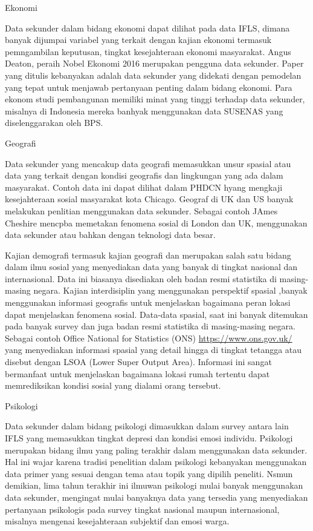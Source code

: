 \documentclass[
]{book}
\begin{document}
Ekonomi

Data sekunder dalam bidang ekonomi dapat dilihat pada data IFLS, dimana banyak dijumpai variabel yang terkait dengan kajian ekonomi termasuk pemngambilan keputusan, tingkat kesejahteraan ekonomi masyarakat. Angus Deaton, peraih Nobel Ekonomi 2016 merupakan pengguna data sekunder. Paper yang ditulis kebanyakan adalah data sekunder yang didekati dengan pemodelan yang tepat untuk menjawab pertanyaan penting dalam bidang ekonomi. Para ekonom studi pembangunan memiliki minat yang tinggi terhadap data sekunder, misalnya di Indonesia mereka banhyak menggunakan data SUSENAS yang diselenggarakan oleh BPS.

Geografi

Data sekunder yang mencakup data geografi memasukkan unsur spasial atau data yang terkait dengan kondisi geografis dan lingkungan yang ada dalam masyarakat. Contoh data ini dapat dilihat dalam PHDCN hyang mengkaji kesejahteraan sosial masyarakat kota Chicago. Geograf di UK dan US banyak melakukan penlitian menggunakan data sekunder. Sebagai contoh JAmes Cheshire mencpba memetakan fenomena sosial di London dan UK, menggunakan data sekunder atau bahkan dengan teknologi data besar.

Kajian demografi termasuk kajian geografi dan merupakan salah satu bidang dalam ilmu sosial yang menyediakan data yang banyak di tingkat nasional dan internasional. Data ini biasanya disediakan oleh badan resmi statistika di masing-masing negara. Kajian interdisiplin yang menggunakan perspektif spasial ,banyak menggunakan informasi geografis untuk menjelaskan bagaimana peran lokasi dapat menjelaskan fenomena sosial. Data-data spasial, saat ini banyak ditemukan pada banyak survey dan juga badan resmi statistika di masing-masing negara. Sebagai contoh Office National for Statistics (ONS) \url{https://www.ons.gov.uk/} yang menyediakan informasi spasial yang detail hingga di tingkat tetangga atau disebut dengan LSOA (Lower Super Output Area). Informasi ini sangat bermanfaat untuk menjelaskan bagaimana lokasi rumah tertentu dapat memrediksikan kondisi sosial yang dialami orang tersebut.

Psikologi

Data sekunder dalam bidang psikologi dimasukkan dalam survey antara lain IFLS yang memasukkan tingkat depresi dan kondisi emosi individu. Psikologi merupakan bidang ilmu yang paling terakhir dalam menggunakan data sekunder. Hal ini wajar karena tradisi penelitian dalam psikologi kebanyakan menggunakan data primer yang sesuai dengan tema atau topik yang dipilih peneliti. Nsmun demikian, lima tahun terakhir ini ilmuwan psikologi mulai banyak menggunakan data sekunder, mengingat mulai banyaknya data yang tersedia yang menyediakan pertanyaan psikologis pada survey tingkat nasional maupun internasional, misalnya mengenai kesejahteraan subjektif dan emosi warga.
\end{document}
